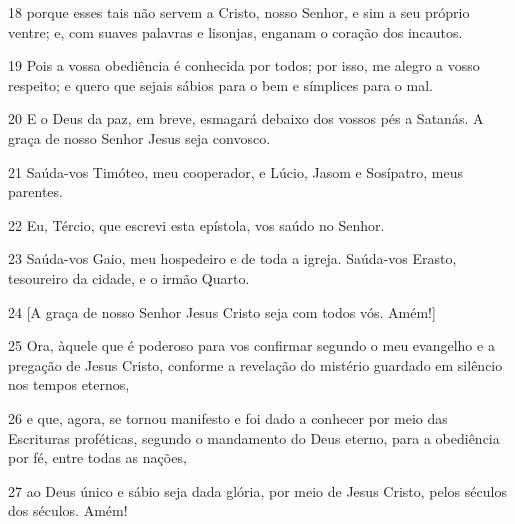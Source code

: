 \par 18 porque esses tais não servem a Cristo, nosso Senhor, e sim a seu próprio ventre; e, com suaves palavras e lisonjas, enganam o coração dos incautos.
\par 19 Pois a vossa obediência é conhecida por todos; por isso, me alegro a vosso respeito; e quero que sejais sábios para o bem e símplices para o mal.
\par 20 E o Deus da paz, em breve, esmagará debaixo dos vossos pés a Satanás. A graça de nosso Senhor Jesus seja convosco.
\par 21 Saúda-vos Timóteo, meu cooperador, e Lúcio, Jasom e Sosípatro, meus parentes.
\par 22 Eu, Tércio, que escrevi esta epístola, vos saúdo no Senhor.
\par 23 Saúda-vos Gaio, meu hospedeiro e de toda a igreja. Saúda-vos Erasto, tesoureiro da cidade, e o irmão Quarto.
\par 24 [A graça de nosso Senhor Jesus Cristo seja com todos vós. Amém!]
\par 25 Ora, àquele que é poderoso para vos confirmar segundo o meu evangelho e a pregação de Jesus Cristo, conforme a revelação do mistério guardado em silêncio nos tempos eternos,
\par 26 e que, agora, se tornou manifesto e foi dado a conhecer por meio das Escrituras proféticas, segundo o mandamento do Deus eterno, para a obediência por fé, entre todas as nações,
\par 27 ao Deus único e sábio seja dada glória, por meio de Jesus Cristo, pelos séculos dos séculos. Amém!


